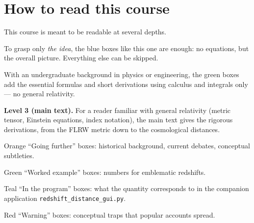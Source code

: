 \documentclass[11pt,a4paper,openany]{report}
\begin{document}
\tableofcontents
\clearpage

\chapter*{How to read this course}

This course is meant to be readable at several depths.

\begin{tcolorbox}[plain]
To grasp only \emph{the idea}, the blue boxes like this one are enough: no
equations, but the overall picture. Everything else can be skipped.
\end{tcolorbox}

\begin{tcolorbox}[undergrad]
With an undergraduate background in physics or engineering, the green boxes
add the essential formulas and short derivations using calculus and integrals
only --- no general relativity.
\end{tcolorbox}

\noindent\textbf{Level 3 (main text).} For a reader familiar with general
relativity (metric tensor, Einstein equations, index notation), the main text
gives the rigorous derivations, from the FLRW metric down to the cosmological
distances.

\begin{tcolorbox}[further]
Orange “Going further” boxes: historical background, current debates,
conceptual subtleties.
\end{tcolorbox}

\begin{tcolorbox}[numeric]
Green “Worked example” boxes: numbers for emblematic redshifts.
\end{tcolorbox}

\begin{tcolorbox}[gui]
Teal “In the program” boxes: what the quantity corresponds to in the
companion application \texttt{redshift\_distance\_gui.py}.
\end{tcolorbox}

\begin{tcolorbox}[warning]
Red “Warning” boxes: conceptual traps that popular accounts spread.
\end{tcolorbox}

\clearpage
\end{document}
